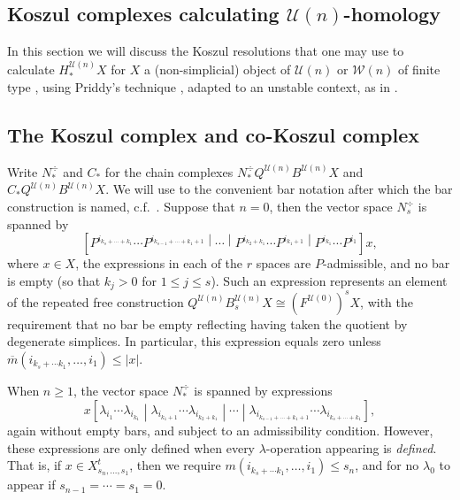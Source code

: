 \documentclass[11pt]{amsart} \renewcommand{\baselinestretch}{1.2}
\theoremstyle{plain}
\theoremstyle{definition}
\newcommand{\calU}{\mathcal{U}}
\newcommand{\calw}{\mathcal{W}}
\newcommand{\citeBOX}[2][]{\cite[\mbox{#1}]{#2}}
\newcommand{\minDimP}{\overline{m}}
\newcommand{\minDimDelta}{m}
\begin{document}
\begin{Koszul complexes}

\section{\textbf{Koszul complexes calculating $\calU(n)$-homology}}
\label{Koszul Cx section}\label{Koszul complexes}
In this section we will discuss the Koszul resolutions that one may use to calculate $H_*^{\calU(n)}X$ for $X$ a (non-simplicial)  object of $\calU(n)$ or $\calw(n)$ of finite type , using Priddy's technique \cite{PriddyKoszul.pdf}, adapted to an unstable context, as in \cite{CurtisSimplicialHtpy.pdf}.

\subsection{The Koszul complex and co-Koszul complex}
Write $N_*^\div $ and $C_*$ for the chain complexes $N_*^\div Q^{\calU(n)}B^{\calU(n)}X$ and $C_* Q^{\calU(n)}B^{\calU(n)}X$.  We will use to the convenient bar notation after which the bar construction is named, c.f.\ \citeBOX[\S7]{grpsHPin.pdf}. Suppose that $n=0$, then the vector space  $N_s^\div$ is spanned by
\[\left[P^{i_{k_s+\cdots +k_1}}\cdots P^{i_{k_{s-1}+\cdots +k_1+1}}
\middle|\cdots 
\middle|P^{i_{k_2+k_1}}\cdots P^{i_{k_1+1}}
\middle|P^{i_{k_1}}\cdots P^{i_1}\right]
x,\]
where $x\in X$, the expressions in each of the $r$ spaces are $P$-admissible, and no bar is empty (so that $k_j>0$ for $1\leq j\leq s$). Such an expression represents an element of the repeated free construction $Q^{\calU(n)}B^{\calU(n)}_sX\cong (F^{\calU(0)})^{s}X$, with the requirement that no bar be empty reflecting having taken the quotient by degenerate simplices. In particular, this expression equals zero unless $\minDimP(i_{k_s+\cdots k_1},\ldots,i_1)\leq |x|$.

When $n\geq1$, the vector space $N_*^\div$ is spanned by expressions \[x\left[\lambda_{i_1}\cdots \lambda_{i_{k_1}} 
\middle|\lambda_{i_{k_1+1}}\cdots \lambda_{i_{k_2+k_1}}
\middle|\cdots\middle|\lambda_{i_{k_{s-1}+\cdots +k_1+1}}\cdots \lambda_{i_{k_s+\cdots +k_1}}\right],
\]
again without empty bars, and subject to an admissibility condition. However, these expressions are only defined when every $\lambda$-operation appearing is \emph{defined}. That is, if $x\in X^{t}_{s_n,\ldots,s_1}$, then we require $\minDimDelta(i_{k_s+\cdots k_1},\ldots,i_1)\leq s_n$, and for no $\lambda_0$ to appear if $s_{n-1}=\cdots =s_1=0$.


\end{Koszul complexes}
\end{document}
